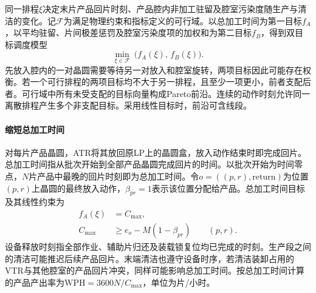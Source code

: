\documentclass[final,5p,times,twocolumn]{elsarticle}
\begin{document}
同一排程$\xi$决定末片产品回片时刻、产品腔内非加工驻留及腔室污染度随生产与清洁的变化。记$\mathcal F$为满足物理约束和指标定义的可行域。以总加工时间为第一目标$f_A$，以平均驻留、片间极差惩罚及腔室污染度项的加权和为第二目标$f_B$，得到双目标调度模型
\begin{equation}
\min_{\xi\in\mathcal F}\ \bigl(f_A(\xi),\,f_B(\xi)\bigr).
\label{eq:biobjective-cn}
\end{equation}
先放入腔内的一对晶圆需要等待另一对放入和腔室旋转，两项目标因此可能存在权衡。若一个可行排程的两项目标均不大于另一排程，且至少一项更小，前者支配后者。可行域中所有未受支配的目标向量构成Pareto前沿。连续的动作时刻允许同一离散排程产生多个非支配目标。采用线性目标时，前沿可含线段\citep{soylu2016biobjective}。

\paragraph{缩短总加工时间}
对每片产品晶圆，ATR将其放回原LP上的晶圆盒，放入动作结束时即完成回片。总加工时间指从批次开始到全部产品晶圆完成回片的时间。以批次开始为时间零点，$N$片产品中最晚的回片时刻即为总加工时间。令$o=((p,r),\mathrm{return})$为位置$(p,r)$上晶圆的最终放入动作，$\beta_{pr}=1$表示该位置分配给产品。总加工时间目标及其线性约束为
\begin{equation}
\begin{aligned}
f_A(\xi)&=C_{\max},\\
C_{\max}&\ge e_o-M(1-\beta_{pr})\qquad (p,r).
\end{aligned}
\label{eq:primary-objective-cn}
\end{equation}
设备释放时刻指全部作业、辅助片归还及装载锁复位均已完成的时刻。生产段之间的清洁可能推迟后续产品回片。末端清洁也遵守设备时序，若清洁装卸占用的VTR与其他腔室的产品回片冲突，同样可能影响总加工时间。按总加工时间计算的产品产出率为$\mathrm{WPH}=3600N/C_{\max}$，单位为片/小时。
\end{document}
